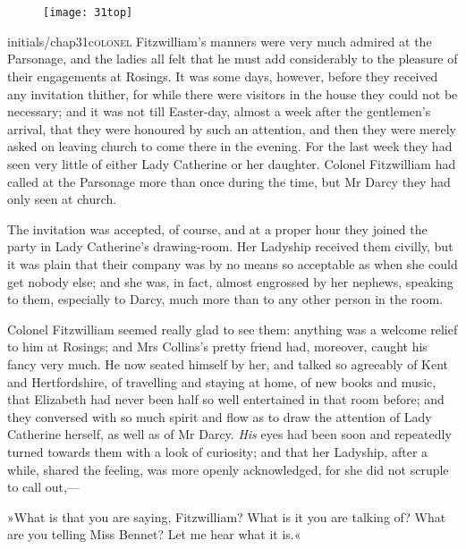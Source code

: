 \chapter[Chapter \thechapter]{}
	
\begin{figure}[t!]
\centering
\texttt{[image: 31top]}
\end{figure}


\lettrine[lines=6,image=true]{initials/chap31c}{olonel}  Fitzwilliam's manners were very much admired at the Parsonage, and the ladies all felt that he must add considerably to the pleasure of their engagements at Rosings. It was some days, however, before they received any invitation thither, for while there were visitors in the house they could not be necessary; and it was not till Easter-day, almost a week after the gentlemen's arrival, that they were honoured by such an attention, and then they were merely asked on leaving church to come there in the evening. For the last week they had seen very little of either Lady Catherine or her daughter. Colonel Fitzwilliam had called at the Parsonage more than once during the time, but Mr Darcy they had only seen at church.

The invitation was accepted, of course, and at a proper hour they joined the party in Lady Catherine's drawing-room. Her Ladyship received them civilly, but it was plain that their company was by no means so acceptable as when she could get nobody else; and she was, in fact, almost engrossed by her nephews, speaking to them, especially to Darcy, much more than to any other person in the room.

Colonel Fitzwilliam seemed really glad to see them: anything was a welcome relief to him at Rosings; and Mrs Collins's pretty friend had, moreover, caught his fancy very much. He now seated himself by her, and talked so agreeably of Kent and Hertfordshire, of travelling and staying at home, of new books and music, that Elizabeth had never been half so well entertained in that room before; and they conversed with so much spirit and flow as to draw the attention of Lady Catherine herself, as well as of Mr Darcy. \textit{His} eyes had been soon and repeatedly turned towards them with a look of curiosity; and that her Ladyship, after a while, shared the feeling, was more openly acknowledged, for she did not scruple to call out,—

»What is that you are saying, Fitzwilliam? What is it you are talking of? What are you telling Miss Bennet? Let me hear what it is.«

